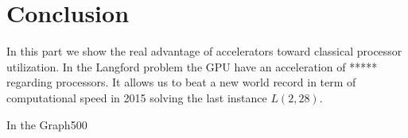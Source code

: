 




\section*{Conclusion}
In this part we show the real advantage of accelerators toward classical processor utilization. 
In the Langford problem the GPU have an acceleration of ***** regarding processors. 
It allows us to beat a new world record in term of computational speed in 2015 solving the last instance $L(2,28)$. 


In the Graph500